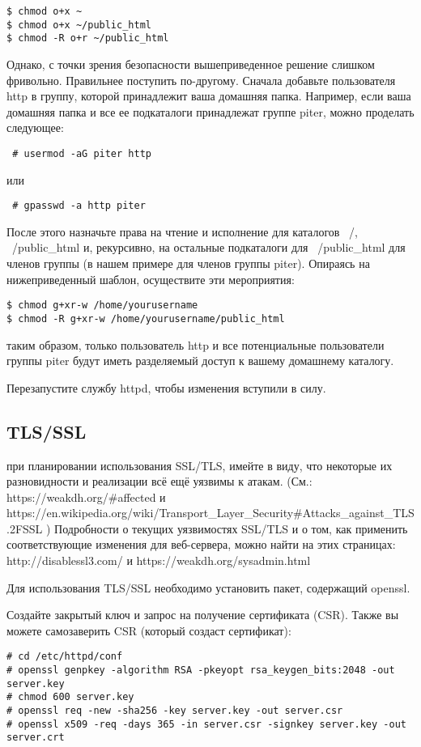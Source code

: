 \documentclass[a4paper,10pt,twoside]{article}
\begin{document}
\begin{verbatim}
$ chmod o+x ~
$ chmod o+x ~/public_html
$ chmod -R o+r ~/public_html
\end{verbatim} 
Однако, с точки зрения безопасности вышеприведенное решение слишком фривольно. Правильнее поступить по-другому. Сначала добавьте пользователя http в группу, которой принадлежит ваша домашняя папка. Например, если ваша домашняя папка и все ее подкаталоги принадлежат группе piter, можно проделать следующее:
\begin{verbatim}
 # usermod -aG piter http
\end{verbatim} 
или
\begin{verbatim}
 # gpasswd -a http piter
\end{verbatim} 
После этого назначьте права на чтение и исполнение для каталогов ~/, ~/public\_html и, рекурсивно, на остальные подкаталоги для ~/public\_html для членов группы (в нашем примере для членов группы piter). Опираясь на нижеприведенный шаблон, осуществите эти мероприятия:
\begin{verbatim}
$ chmod g+xr-w /home/yourusername
$ chmod -R g+xr-w /home/yourusername/public_html
\end{verbatim} 

 таким образом, только пользователь http и все потенциальные пользователи группы piter будут иметь разделяемый доступ к вашему домашнему каталогу.

Перезапустите службу httpd, чтобы изменения вступили в силу.

\subsection{TLS/SSL}
 при планировании использования SSL/TLS, имейте в виду, что некоторые их разновидности и реализации всё ещё уязвимы к атакам. (См.: https://weakdh.org/\#affected и https://en.wikipedia.org/wiki/Transport\_Layer\_Security\#Attacks\_against\_TLS.2FSSL ) Подробности о текущих уязвимостях SSL/TLS и о том, как применить соответствующие изменения для веб-сервера, можно найти на этих страницах: http://disablessl3.com/ и https://weakdh.org/sysadmin.html

Для использования TLS/SSL необходимо установить пакет, содержащий openssl.

Создайте закрытый ключ и запрос на получение сертификата (CSR). Также вы можете самозаверить CSR (который создаст сертификат):
\begin{verbatim}
# cd /etc/httpd/conf
# openssl genpkey -algorithm RSA -pkeyopt rsa_keygen_bits:2048 -out server.key
# chmod 600 server.key
# openssl req -new -sha256 -key server.key -out server.csr
# openssl x509 -req -days 365 -in server.csr -signkey server.key -out server.crt
\end{verbatim} 
\end{document}
